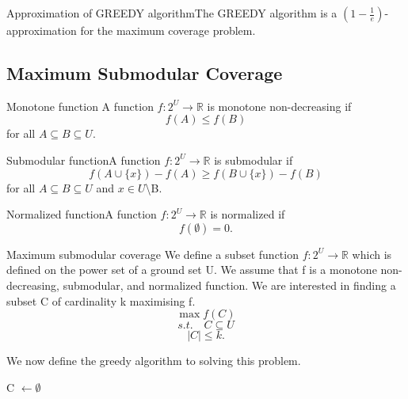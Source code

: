 \documentclass[twoside]{article}
\begin{document}
\begin{theorem_exam}{Approximation of GREEDY algorithm}{}The GREEDY algorithm is a $(1 - \frac{1}{e})$-approximation for the maximum coverage problem.
\end{theorem_exam}


\subsection{Maximum Submodular Coverage}
\begin{definition_exam}{Monotone function}{} A function $f: 2^U \rightarrow \mathbb{R}$ is monotone non-decreasing if 
$$
f(A) \leq f(B)
$$
for all $A \subseteq B \subseteq U.$
\end{definition_exam}

\begin{definition_exam}{Submodular function}{}A function $f: 2^U \rightarrow \mathbb{R}$ is submodular if 
$$
f(A \cup \{x\}) - f(A) \geq f(B \cup \{x\}) - f(B)
$$
for all $A \subseteq B \subseteq U$ and $x \in U$\textbackslash B.
\end{definition_exam}

\begin{definition_exam}{Normalized function}{}A function $f:2^U \rightarrow \mathbb{R}$ is normalized if 
$$
f(\emptyset) = 0.
$$
\end{definition_exam}

\begin{definition_exam}{Maximum submodular coverage}{}
We define a subset function $f: 2^U \rightarrow \mathbb{R}$ which is defined on the power set of a ground set U. We assume that f is a monotone non-decreasing, submodular, and normalized function. We are interested in finding a subset C of cardinality k maximising f.
$$
\max f(C)
$$
$$
s.t. \quad C \subseteq U
$$
$$
|C| \leq k.
$$
\end{definition_exam}

We now define the greedy algorithm to solving this problem.


\begin{algorithm}
\DontPrintSemicolon
{}
C $\gets \emptyset$\;


\;
\caption{{\sc GREEDY Algorithm for Submodular Coverage}}
\label{algo:duplicate}
\end{algorithm}
\end{document}
